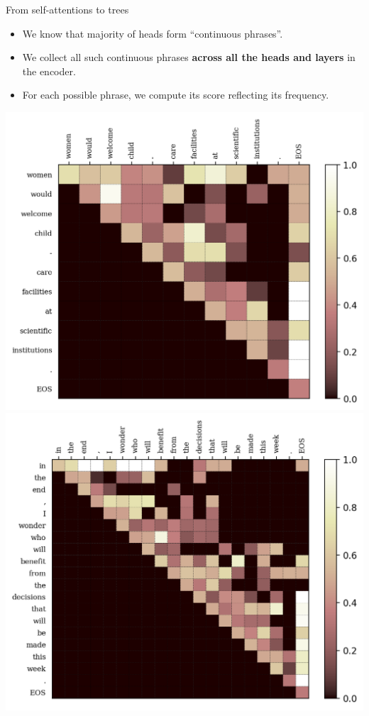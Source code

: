 \documentclass{beamer}
\begin{document}
\begin{frame}{From self-attentions to trees}
\begin{itemize}
    \item We know that majority of heads form ``continuous phrases''. 
    \item We collect all such continuous phrases \textbf{across all the heads and layers} in the encoder.
    \item For each possible phrase, we compute its score reflecting its frequency.
\end{itemize}
   \begin{center}
        \includegraphics[scale=0.43]{weights-s5.png}
        \includegraphics[scale=0.43]{weights-s25.png}
    \end{center}
\end{frame}
\end{document}
